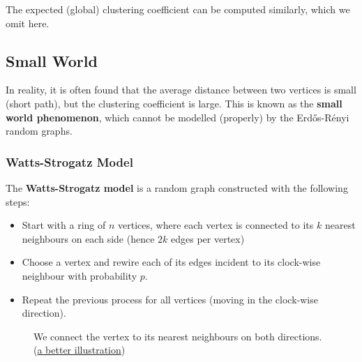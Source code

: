 \documentclass{article}
\begin{document}
The expected (global) clustering coefficient can be computed similarly, which we omit here.  

\subsection{Small World}

In reality, it is often found that the average distance between two vertices is small (short path), but the clustering coefficient is large. This is known as the \textbf{small world phenomenon}, which cannot be modelled (properly) by the Erd\H{o}s-R\'{e}nyi random graphs.  

\subsubsection{Watts-Strogatz Model}
The \textbf{Watts-Strogatz model} is a random graph constructed with the following steps:
\begin{itemize}
    \item Start with a ring of $n$ vertices, where each vertex is connected to its $k$ nearest neighbours on each side (hence $2k$ edges per vertex)
    \item Choose a vertex and rewire each of its edges incident to its clock-wise neighbour with probability $p$.
    \item Repeat the previous process for all vertices (moving in the clock-wise direction).
\end{itemize}

\begin{figure}[H]
    \centering
    \caption{We connect the vertex to its nearest neighbours on both directions. (\href{https://www.kth.se/social/files/5605669af2765468be471eda/lecture\%204\%20\%282015\%29.pdf}{a better illustration})}
    \label{fig:watts-strogatz}
\end{figure}
\end{document}

